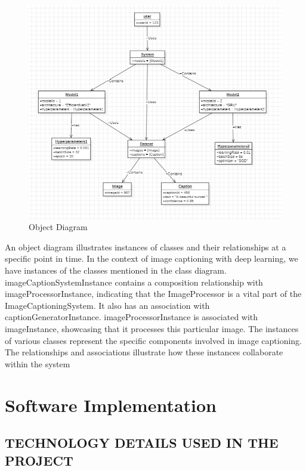 \documentclass[oneside,a4paper,12pt]{report}
\begin{document}
\begin{figure}[H]
\begin{center}
\includegraphics[width=1.0\linewidth]{objf}
\caption{Object Diagram}
\label{Fig:f4}
\end{center}
\end{figure}
An object diagram illustrates instances of classes and their relationships at a specific point in time. In the context of image captioning with deep learning, we have instances of the classes mentioned in the class diagram. imageCaptionSystemInstance contains a composition relationship with imageProcessorInstance, indicating that the ImageProcessor is a vital part of the ImageCaptioningSystem. It also has an association with captionGeneratorInstance. imageProcessorInstance is associated with imageInstance, showcasing that it processes this particular image. The instances of various classes represent the specific components involved in image captioning. The relationships and associations illustrate how these instances collaborate within the system\cite{r6}




\chapter{Software Implementation}
\section{TECHNOLOGY DETAILS USED IN THE PROJECT}
\end{document}
